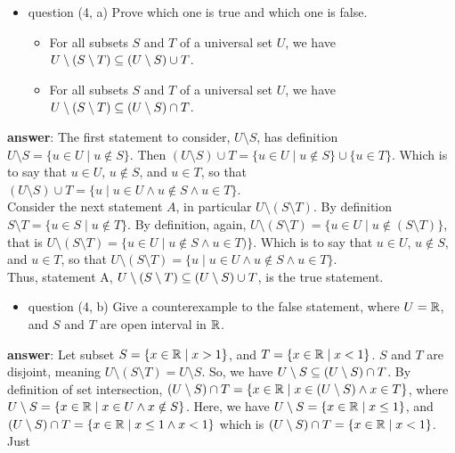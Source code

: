 \documentclass[12pt]{article}
\begin{document}
\begin{itemize}
\item question (4, a) Prove which one is true and which one is false.
\begin{itemize}
\item For all subsets \(S\) and \(T\) of a universal set \(U\), we have \(U\setminus(S\setminus{}T)\subseteq(U\setminus{}S)\cup{}T\).
\item For all subsets \(S\) and \(T\) of a universal set \(U\), we have \(U\setminus(S\setminus{}T)\subseteq(U\setminus{}S)\cap{}T\).
\end{itemize}
\end{itemize}
\textbf{answer}: The first statement to consider, \(U\setminus{}S\), has definition
\(U\setminus{}S=\{u\in{}U\mid{}u\notin{}S\}\). Then \((U\setminus{}S)\cup{}T=\{u\in{}U\mid{}u\notin{}S\}\cup\{u\in{}T\}\). Which is to say
that \(u\in{}U\), \(u\notin{}S\), and \(u\in{}T\), so that \((U\setminus{}S)\cup{}T=\{u\mid{}u\in{}U\land{}u\notin{}S\land{}u\in{}T\}\). \\
Consider the next statement \(A\), in particular \(U\setminus(S\setminus{}T)\). By definition
\(S\setminus{}T=\{u\in{}S\mid{}u\notin{}T\}\). By definition, again, \(U\setminus{}(S\setminus{}T)=\{u\in{}U\mid{}u\notin{}(S\setminus{}T)\}\),
that is \(U\setminus{}(S\setminus{}T)=\{u\in{}U\mid{}u\notin{}S\land{}u\in{}T)\}\). Which is to say that \(u\in{}U\), \(u\notin{}S\), and
\(u\in{}T\), so that \(U\setminus{}(S\setminus{}T)=\{u\mid{}u\in{}U\land{}u\notin{}S\land{}u\in{}T\}\). \\
Thus, statement A, \(U\setminus(S\setminus{}T)\subseteq(U\setminus{}S)\cup{}T\), is the true statement.
\begin{itemize}
\item question (4, b) Give a counterexample to the false statement, where \(U=\mathbb{R}\),
and \(S\) and \(T\) are open interval in \(\mathbb{R}\).
\end{itemize}
\textbf{answer}: Let subset \(S=\{x\in\mathbb{R}\mid{}x>1\}\), and \(T=\{x\in\mathbb{R}\mid{}x<1\}\). \(S\)
and \(T\) are disjoint, meaning \(U\setminus{}(S\setminus{}T)=U\setminus{}S\). So, we have \(U\setminus{}S\subseteq{}(U\setminus{}S)\cap{}T\). By
definition of set intersection, \((U\setminus{}S)\cap{}T=\{x\in\mathbb{R}\mid{}x\in{}(U\setminus{}S)\land{}x\in{}T\}\), where
\(U\setminus{}S=\{x\in\mathbb{R}\mid{}x\in{}U\land{}x\notin{}S\}\). Here, we have \(U\setminus{}S=\{x\in\mathbb{R}\mid{}x\le{}1\}\), and
\((U\setminus{}S)\cap{}T=\{x\in\mathbb{R}\mid{}x\le1\land{}x<1\}\) which is \((U\setminus{}S)\cap{}T=\{x\in\mathbb{R}\mid{}x<1\}\). Just
\end{document}

